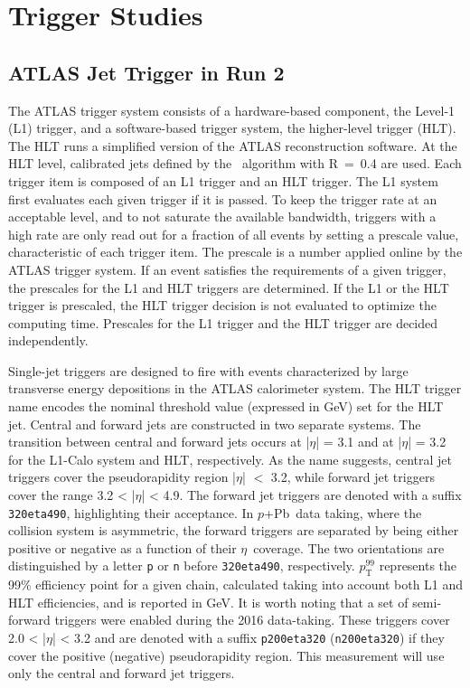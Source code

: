 \documentclass[NOTE, atlasdraft=true, texlive=2020, UKenglish]{atlasdoc}
\newcommand{\PTE}{p_{\text{T}}}
\newcommand{\ETA}{$\eta$}
\newcommand{\pxPb}{$p$+Pb}
\begin{document}
%
\clearpage{}
\clearpage{}\section{Trigger Studies}
\label{sec:trig_evsel}


\subsection{ATLAS Jet Trigger in Run 2}
The ATLAS trigger system consists of a hardware-based component, the Level-1 (L1) trigger, and a software-based trigger system, the higher-level trigger (HLT). The HLT runs a simplified version of the ATLAS reconstruction software. At the HLT level, calibrated jets defined by the \antikt\ algorithm with R~=~0.4 are used. 
Each trigger item is composed of an L1 trigger and an HLT trigger. The L1 system first evaluates each given trigger if it is passed. To keep the trigger rate at an acceptable level, and to not saturate the available bandwidth, triggers with a high rate are only read out for a fraction of all events by setting a prescale value, characteristic of each trigger item. The prescale is a number applied online by the ATLAS trigger system. If an event satisfies the requirements of a given trigger, the prescales for the L1 and HLT triggers are determined. If the L1 or the HLT trigger is prescaled, the HLT trigger decision is not evaluated to optimize the computing time. Prescales for the L1 trigger and the HLT trigger are decided independently. 

Single-jet triggers are designed to fire with events characterized by large transverse energy depositions in the ATLAS calorimeter system. 
The HLT trigger name encodes the nominal threshold value (expressed in GeV) set for the HLT jet. Central and forward jets are constructed in two separate systems. The transition between central and forward jets occurs at |\ETA| = 3.1  and at |\ETA| = 3.2 for the L1-Calo system and HLT, respectively.
As the name suggests, central jet triggers cover the pseudorapidity region |\ETA| $<$ 3.2, while forward jet triggers cover the range
3.2 < |\ETA| < 4.9. The forward jet triggers are denoted with a suffix \texttt{320eta490}, highlighting their acceptance. In \pxPb\ data taking, where the collision system is asymmetric, the forward triggers are separated by being either positive or negative as a function of their \ETA\ coverage. The two orientations are distinguished by a letter \texttt{p} or \texttt{n} before \texttt{320eta490}, respectively. $\PTE^{99}$ represents the 99\% efficiency point for a given chain, calculated taking into account both L1 and HLT efficiencies, and is reported in GeV.
It is worth noting that a set of semi-forward triggers were enabled during the 2016 data-taking. These triggers cover 2.0 < |\ETA| < 3.2 and are denoted with a suffix \texttt{p200eta320} (\texttt{n200eta320}) if they cover the positive (negative) pseudorapidity region. 
This measurement will use only the central and forward jet triggers. 
\end{document}
